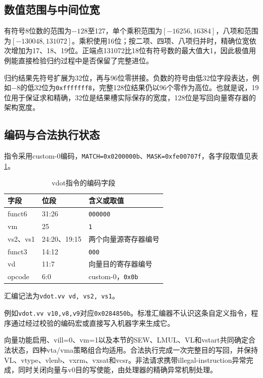 
\subsection{数值范围与中间位宽}
有符号8位数的范围为$-128$至127，单个乘积范围为$[-16256,16384]$，八项和范围为$[-130048,131072]$。乘积使用16位；按二项、四项、八项归并时，精确位宽依次增加为17、18、19位。正端点131072比18位有符号数的最大值大1，因此极值用例能直接检验归约过程中是否保留了完整进位。

归约结果先符号扩展为32位，再与96位零拼接。负数的符号由低32位字段表达，例如$-8$的低32位为\texttt{0xfffffff8}，完整128位结果仍以96个零作为高位。也就是说，19位用于保证求和精确，32位是结果槽实际保存的宽度，128位是写回向量寄存器的架构宽度。

\subsection{编码与合法执行状态}
指令采用custom-0编码，\texttt{MATCH=0x0200000b}、\texttt{MASK=0xfe00707f}，各字段取值见表\ref{tab:s2-encoding}。
\begin{table}[!htbp]\centering
\small
\caption{vdot指令的编码字段}\label{tab:s2-encoding}
\begin{tabular}{lll}
\toprule
字段 & 位段 & 含义或取值\\
\midrule
funct6 & 31:26 & \texttt{000000}\\
vm & 25 & \texttt{1}\\
vs2、vs1 & 24:20、19:15 & 两个向量源寄存器编号\\
funct3 & 14:12 & \texttt{000}\\
vd & 11:7 & 向量目的寄存器编号\\
opcode & 6:0 & custom-0，\texttt{0x0b}\\
\bottomrule
\end{tabular}
\end{table}
汇编记法为\texttt{vdot.vv vd, vs2, vs1}。

例如\texttt{vdot.vv v10,v8,v9}对应\texttt{0x0284850b}。标准汇编器不认识这条自定义指令，程序通过经过校验的编码宏或直接写入机器字来生成它。

向量功能启用、vill=0、vm=1以及本节的SEW、LMUL、VL和vstart共同确定合法状态，四种vta/vma策略组合均适用。合法执行完成一次完整目的写回，并保持VL、vtype、vlenb、vxrm、vxsat和vcsr。非法请求携带illegal-instruction异常完成，同时关闭向量与v0目的写使能，由处理器的精确异常机制处理。

